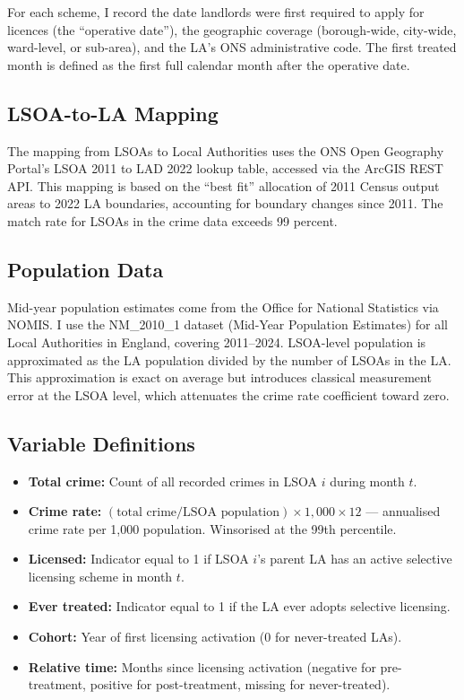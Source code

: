 \documentclass[12pt]{article}
\begin{document}
For each scheme, I record the date landlords were first required to apply for licences (the ``operative date''), the geographic coverage (borough-wide, city-wide, ward-level, or sub-area), and the LA's ONS administrative code. The first treated month is defined as the first full calendar month after the operative date.

\subsection{LSOA-to-LA Mapping}

The mapping from LSOAs to Local Authorities uses the ONS Open Geography Portal's LSOA 2011 to LAD 2022 lookup table, accessed via the ArcGIS REST API. This mapping is based on the ``best fit'' allocation of 2011 Census output areas to 2022 LA boundaries, accounting for boundary changes since 2011. The match rate for LSOAs in the crime data exceeds 99 percent.

\subsection{Population Data}

Mid-year population estimates come from the Office for National Statistics via NOMIS. I use the NM\_2010\_1 dataset (Mid-Year Population Estimates) for all Local Authorities in England, covering 2011--2024. LSOA-level population is approximated as the LA population divided by the number of LSOAs in the LA. This approximation is exact on average but introduces classical measurement error at the LSOA level, which attenuates the crime rate coefficient toward zero.

\subsection{Variable Definitions}

\begin{itemize}
\item \textbf{Total crime:} Count of all recorded crimes in LSOA $i$ during month $t$.
\item \textbf{Crime rate:} $(\text{total crime} / \text{LSOA population}) \times 1{,}000 \times 12$ --- annualised crime rate per 1{,}000 population. Winsorised at the 99th percentile.
\item \textbf{Licensed:} Indicator equal to 1 if LSOA $i$'s parent LA has an active selective licensing scheme in month $t$.
\item \textbf{Ever treated:} Indicator equal to 1 if the LA ever adopts selective licensing.
\item \textbf{Cohort:} Year of first licensing activation (0 for never-treated LAs).
\item \textbf{Relative time:} Months since licensing activation (negative for pre-treatment, positive for post-treatment, missing for never-treated).
\end{itemize}
\end{document}
